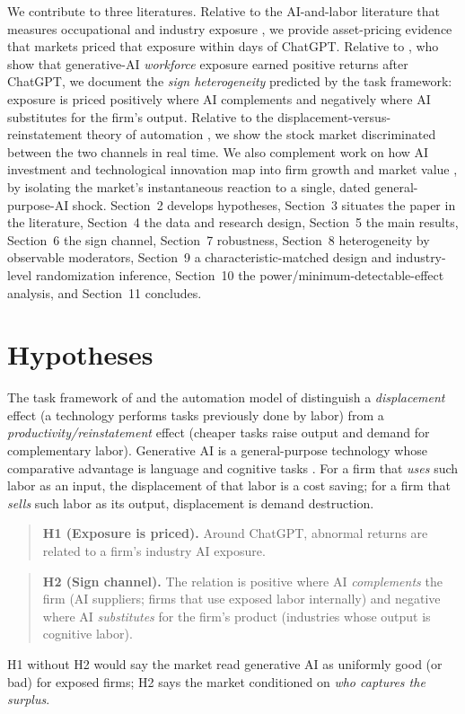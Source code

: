 \documentclass[12pt]{article}
\begin{document}
We contribute to three literatures. Relative to the AI-and-labor literature that
measures occupational and industry exposure \citep{felten2021,webb2020,eloundou2024},
we provide asset-pricing evidence that markets priced that exposure within days of
ChatGPT. Relative to \citet{eisfeldt2023}, who show that generative-AI \emph{workforce}
exposure earned positive returns after ChatGPT, we document the \emph{sign heterogeneity}
predicted by the task framework: exposure is priced positively where AI complements and
negatively where AI substitutes for the firm's output. Relative to the
displacement-versus-reinstatement theory of automation \citep{acemoglu2019,autor2003},
we show the stock market discriminated between the two channels in real time. We also complement work on how AI investment and
technological innovation map into firm growth and market value
\citep{babina2024,kogan2017}, by isolating the market's instantaneous reaction to a
single, dated general-purpose-AI shock.
Section~2 develops hypotheses, Section~3 situates the paper in the literature, Section~4 the
data and research design, Section~5 the main results, Section~6 the sign channel, Section~7
robustness, Section~8 heterogeneity by observable moderators, Section~9 a characteristic-matched
design and industry-level randomization inference, Section~10 the power/minimum-detectable-effect
analysis, and Section~11 concludes.

\section{Hypotheses}
The task framework of \citet{autor2003} and the automation model of
\citet{acemoglu2019} distinguish a \emph{displacement} effect (a technology performs
tasks previously done by labor) from a \emph{productivity/reinstatement} effect (cheaper
tasks raise output and demand for complementary labor). Generative AI is a
general-purpose technology whose comparative advantage is language and cognitive tasks
\citep{eloundou2024,felten2023}. For a firm that \emph{uses} such labor as an input, the
displacement of that labor is a cost saving; for a firm that \emph{sells} such labor as
its output, displacement is demand destruction.
\begin{quote}
\textbf{H1 (Exposure is priced).} Around ChatGPT, abnormal returns are related to a
firm's industry AI exposure.
\end{quote}
\begin{quote}
\textbf{H2 (Sign channel).} The relation is positive where AI \emph{complements} the
firm (AI suppliers; firms that use exposed labor internally) and negative where AI
\emph{substitutes} for the firm's product (industries whose output is cognitive labor).
\end{quote}
H1 without H2 would say the market read generative AI as uniformly good (or bad) for
exposed firms; H2 says the market conditioned on \emph{who captures the surplus}.
\end{document}
